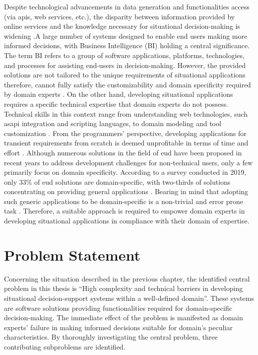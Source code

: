 Despite technological advancements in data generation and functionalities access (via \gls{api}s, web services, etc.), the disparity between information provided by online services and the knowledge necessary for situational decision-making is widening \autocite{Noran2018}.A large number of systems designed to enable end users making more informed decisions, with Business Intelligence (BI) holding a central significance. The term BI refers to a group of software applications, platforms, technologies, and processes for assisting end-users in decision-making. However, the provided solutions are not tailored to the unique requirements of situational applications therefore, cannot fully satisfy the customizability and domain specificity required by domain experts \autocite{Pahlke2010} \autocite{Ardito2018}.
On the other hand, developing situational applications requires a specific technical expertise that domain experts do not possess. Technical skills in this context range from understanding web technologies, such as\gls{api} integration and scripting languages, to domain modeling and tool customization \autocite{Ponce2022}. From the programmers' perspective, developing applications for transient requirements from scratch is deemed unprofitable in terms of time and effort \autocite{Aghaee2014}. Although numerous solutions in the field of \gls{eud} have been proposed in recent years to address development challenges for non-technical users, only a few primarily focus on domain specificity. According to a survey conducted in 2019, only 33\% of \gls{eud} solutions are domain-specific, with two-thirds of solutions concentrating on providing general applications \autocite{Santos2019}. Bearing in mind that adopting such generic applications to be domain-specific is a non-trivial and error prone task \autocite{Soi2014a}. Therefore, a suitable approach is required to empower domain experts in developing situational applications in compliance with their domain of expertise.


\vspace{-15pt}
\hypertarget{sec:problem}{%
\section{Problem Statement}\label{sec:problem}}
\vspace{15pt}

Concerning the situation described in the previous chapter, the identified central problem in this thesis is “High complexity and technical barriers in developing situational decision-support systems within a well-defined domain”. These systems are software solutions providing functionalities required for domain-specific decision-making. The immediate effect of the problem is manifested as domain experts’ failure in making informed decisions suitable for domain’s peculiar characteristics. 
By thoroughly investigating the central problem, three contributing subproblems are identified.


